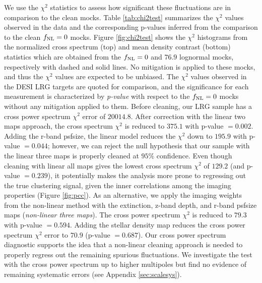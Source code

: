 We use the $\chi^{2}$ statistics to assess how significant these fluctuations are in comparison to the clean mocks. Table \ref{tab:chi2test} summarizes the $\chi^{2}$ values observed in the data and the corresponding p-values inferred from the comparison to the clean $f_{\rm NL}=0$ mocks. Figure \ref{fig:chi2test} shows the $\chi^{2}$ histograms from the normalized cross spectrum (top) and mean density contrast (bottom) statistics which are obtained from the $f_{\rm NL}=0$ and $76.9$ lognormal mocks, respectively with dashed and solid lines. No mitigation is applied to these mocks, and thus the $\chi^{2}$ values are expected to be unbiased. The $\chi^{2}$ values observed in the DESI LRG targets are quoted for comparison, and the significance for each measurement is characterized by \textit{p-value} with respect to the $f_{\rm NL}=0$ mocks without any mitigation applied to them. Before cleaning, our LRG sample has a cross power spectrum $\chi^{2}$ error of $20014.8$. After correction with the linear two maps approach, the cross spectrum $\chi^{2}$ is reduced to $375.1$ with p-value $=0.002$. Adding the r-band psfsize, the linear model reduces the $\chi^{2}$ down to $195.9$ with p-value $=0.044$; however, we can reject the null hypothesis that our sample with the linear three maps is properly cleaned at $95\%$ confidence. Even though cleaning with linear all maps gives the lowest cross spectrum $\chi^{2}$ of $129.2$ (and p-value $=0.239$), it potentially makes the analysis more prone to regressing out the true clustering signal, given the inner correlations among the imaging properties (Figure \ref{fig:pcc}). As an alternative, we apply the imaging weights from the non-linear method with the extinction, z-band depth, and r-band psfsize maps (\textit{non-linear three maps}). The cross power spectrum $\chi^{2}$ is reduced to $79.3$ with p-value $=0.594$. Adding the stellar density map reduces the cross power spectrum $\chi^{2}$ error to $70.9$ (p-value $=0.687$). Our cross power spectrum diagnostic supports the idea that a non-linear cleaning approach is needed to properly regress out the remaining spurious fluctuations. We investigate the test with the cross power spectrum up to higher multipoles but find no evidence of remaining systematic errors (see Appendix \ref{sec:scalesys}). 

